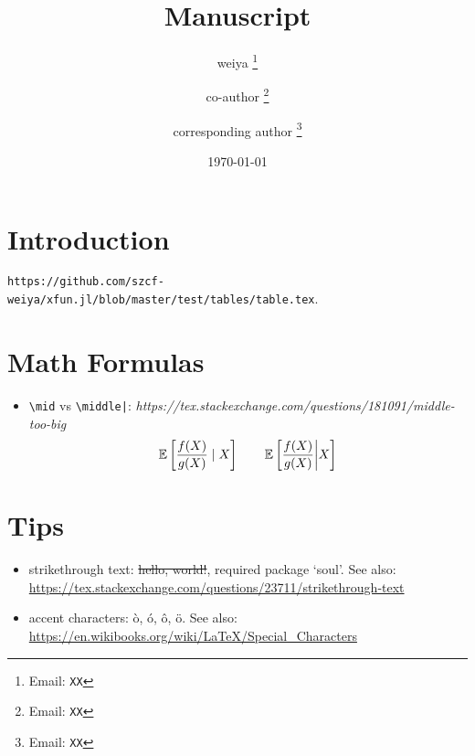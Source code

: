 \documentclass[12pt]{article}
\title{Manuscript}
\author[1]{weiya%
  \thanks{Email: \texttt{XX}}
}
\affil[1]{Department of Statistics, XX}
\author[1]{co-author%
  \thanks{Email: \texttt{XX}}
}
\author[2]{corresponding author%
\thanks{Email: \texttt{XX}}
}
\affil[2]{Department of Statistics, XX}
\date{\today}
\begin{document}
\maketitle
\pagestyle{fancy}
\lhead{}
\rhead{}

\maketitle

\section{Introduction}

\begin{table}[H]
    \centering
    \resizebox{1.0\textwidth}{!}{%
        
    }
    \caption{\texttt{https://github.com/szcf-weiya/xfun.jl/blob/master/test/tables/table.tex}.}
    \label{tab:test}
\end{table}

\section{Math Formulas}

\begin{itemize}
    \item \verb#\mid# vs \verb#\middle|#: \textit{https://tex.stackexchange.com/questions/181091/middle-too-big}
    $$
    {\mathbb E}\left[\frac{f(X)}{g(X)}\mid X\right] \qquad {\mathbb E}\left[\frac{f(X)}{g(X)}\middle| X\right]
    $$
\end{itemize}


\section{Tips}

\begin{itemize}
  \item strikethrough text: \st{hello, world!}, required package `soul'. See also: \url{https://tex.stackexchange.com/questions/23711/strikethrough-text}
  \item accent characters: \`{o}, \'{o}, \^{o}, \"{o}. See also: \url{https://en.wikibooks.org/wiki/LaTeX/Special_Characters}
\end{itemize}


\printbibliography
\end{document}

